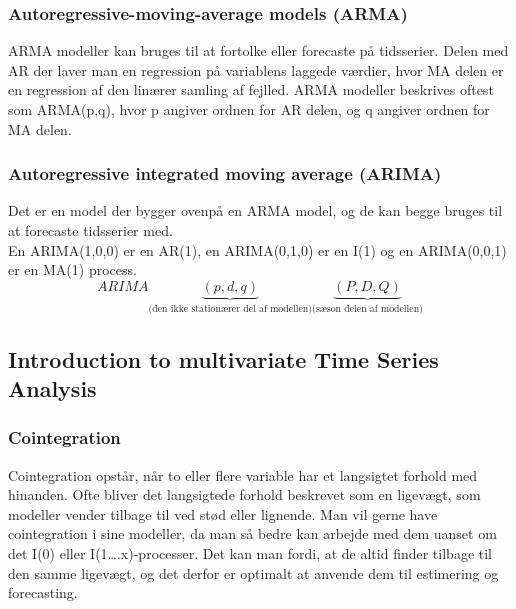 \documentclass[
  10pt,
]{article}
\begin{document}
\hypertarget{autoregressive-moving-average-models-arma}{%
\subsubsection{Autoregressive-moving-average models
(ARMA)}\label{autoregressive-moving-average-models-arma}}

ARMA modeller kan bruges til at fortolke eller forecaste på tidsserier.
Delen med AR der laver man en regression på variablens laggede værdier,
hvor MA delen er en regression af den linærer samling af fejlled. ARMA
modeller beskrives oftest som ARMA(p,q), hvor p angiver ordnen for AR
delen, og q angiver ordnen for MA delen.\\

\hypertarget{autoregressive-integrated-moving-average-arima}{%
\subsubsection{Autoregressive integrated moving average
(ARIMA)}\label{autoregressive-integrated-moving-average-arima}}

Det er en model der bygger ovenpå en ARMA model, og de kan begge bruges
til at forecaste tidsserier med.\\
En ARIMA(1,0,0) er en AR(1), en ARIMA(0,1,0) er en I(1) og en
ARIMA(0,0,1) er en MA(1) process.\\
\[ARIMA\underbrace{(p,d,q)}_\text{(den ikke stationærer del af modellen)}\underbrace{(P,D,Q)}_\text{(sæson delen af modellen)}\]

\newpage

\hypertarget{introduction-to-multivariate-time-series-analysis}{%
\subsection{Introduction to multivariate Time Series
Analysis}\label{introduction-to-multivariate-time-series-analysis}}

\hypertarget{cointegration}{%
\subsubsection{Cointegration}\label{cointegration}}

Cointegration opstår, når to eller flere variable har et langsigtet
forhold med hinanden. Ofte bliver det langsigtede forhold beskrevet som
en ligevægt, som modeller vender tilbage til ved stød eller lignende.
Man vil gerne have cointegration i sine modeller, da man så bedre kan
arbejde med dem uanset om det I(0) eller I(1\ldots.x)-processer. Det kan
man fordi, at de altid finder tilbage til den samme ligevægt, og det
derfor er optimalt at anvende dem til estimering og forecasting.
\end{document}
